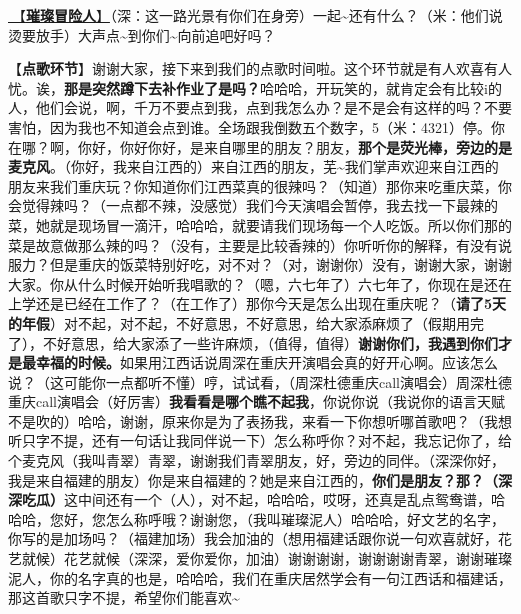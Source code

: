 \documentclass[]{ctexbook}
\begin{document}
\hyperref[adventurers]{🎵【\textbf{璀璨冒险人}】}（深：这一路光景有你们在身旁）一起\textasciitilde 还有什么？（米：他们说烫要放手）大声点\textasciitilde 到你们\textasciitilde 向前追吧好吗？

【\textbf{点歌环节}】谢谢大家，接下来到我们的点歌时间啦。这个环节就是有人欢喜有人忧。诶，\textbf{那是突然蹲下去补作业了是吗？}哈哈哈，开玩笑的，就肯定会有比较i的人，他们会说，啊，千万不要点到我，点到我怎么办？是不是会有这样的吗？不要害怕，因为我也不知道会点到谁。全场跟我倒数五个数字，5（米：4321）停。你在哪？啊，你好，你好你好，是来自哪里的朋友？朋友，\textbf{那个是荧光棒，旁边的是麦克风}。（你好，我来自江西的）来自江西的朋友，芜\textasciitilde 我们掌声欢迎来自江西的朋友来我们重庆玩？你知道你们江西菜真的很辣吗？（知道）那你来吃重庆菜，你会觉得辣吗？（一点都不辣，没感觉）我们今天演唱会暂停，我去找一下最辣的菜，她就是现场冒一滴汗，哈哈哈，就要请我们现场每一个人吃饭。所以你们那的菜是故意做那么辣的吗？（没有，主要是比较香辣的）你听听你的解释，有没有说服力？但是重庆的饭菜特别好吃，对不对？（对，谢谢你）没有，谢谢大家，谢谢大家。你从什么时候开始听我唱歌的？（嗯，六七年了）六七年了，你现在是还在上学还是已经在工作了？（在工作了）那你今天是怎么出现在重庆呢？（\textbf{请了5天的年假}）对不起，对不起，不好意思，不好意思，给大家添麻烦了（假期用完了），不好意思，给大家添了一些许麻烦，（值得，值得）\textbf{谢谢你们，我遇到你们才是最幸福的时候。}如果用江西话说周深在重庆开演唱会真的好开心啊。应该怎么说？（这可能你一点都听不懂）哼，试试看，（周深杜德重庆call演唱会）周深杜德重庆call演唱会（好厉害）\textbf{我看看是哪个瞧不起我}，你说你说（我说你的语言天赋不是吹的）哈哈，谢谢，原来你是为了表扬我，来看一下你想听哪首歌吧？（我想听只字不提，还有一句话让我同伴说一下）怎么称呼你？对不起，我忘记你了，给个麦克风（我叫青翠）青翠，谢谢我们青翠朋友，好，旁边的同伴。（深深你好，我是来自福建的朋友）你是来自福建的？她是来自江西的，\textbf{你们是朋友？那？（深深吃瓜）}这中间还有一个（人），对不起，哈哈哈，哎呀，还真是乱点鸳鸯谱，哈哈哈，您好，您怎么称呼哦？谢谢您，（我叫璀璨泥人）哈哈哈，好文艺的名字，你写的是加场吗？（福建加场）我会加油的（想用福建话跟你说一句欢喜就好，花艺就候）花艺就候（深深，爱你爱你，加油）谢谢谢谢，谢谢谢谢青翠，谢谢璀璨泥人，你的名字真的也是，哈哈哈，我们在重庆居然学会有一句江西话和福建话，那这首歌只字不提，希望你们能喜欢\textasciitilde{}
\end{document}

